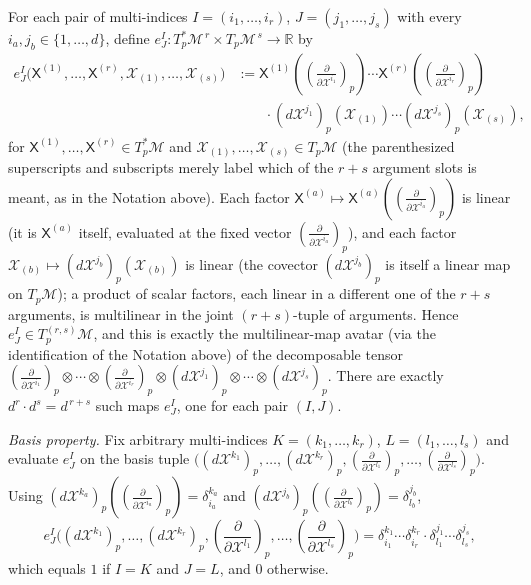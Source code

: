 \documentclass[11pt]{article}
\newcommand{\TpM}{T_p\mathcal M}
\newcommand{\TpsM}{T_p^*\mathcal M}
\newcommand{\TprsM}{T_p^{(r,s)}\mathcal M}
\begin{document}
For each pair of multi-indices $I=(i_1,\dots,i_r)$, $J=(j_1,\dots,j_s)$
with every $i_a,j_b\in\{1,\dots,d\}$, define
$e^I_J:\TpsM^{\,r}\times\TpM^{\,s}\to\mathbb R$ by
\begin{align*}
e^I_J\big(\mathsf X^{(1)},\dots,\mathsf X^{(r)},\mathcal X_{(1)},\dots,\mathcal X_{(s)}\big) &:= \mathsf X^{(1)}\!\left(\left(\frac{\partial}{\partial\mathcal X^{i_1}}\right)_p\right)\cdots \mathsf X^{(r)}\!\left(\left(\frac{\partial}{\partial\mathcal X^{i_r}}\right)_p\right) \\
&\qquad\cdot(d\mathcal X^{j_1})_p(\mathcal X_{(1)})\cdots(d\mathcal X^{j_s})_p(\mathcal X_{(s)}),
\end{align*}
for $\mathsf X^{(1)},\dots,\mathsf X^{(r)}\in\TpsM$ and $\mathcal
X_{(1)},\dots,\mathcal X_{(s)}\in\TpM$ (the parenthesized superscripts and
subscripts merely label which of the $r+s$ argument slots is meant, as in
the Notation above). Each factor $\mathsf X^{(a)}\mapsto\mathsf
X^{(a)}\!\left(\left(\frac{\partial}{\partial\mathcal
X^{i_a}}\right)_p\right)$ is linear (it is $\mathsf X^{(a)}$ itself,
evaluated at the fixed vector $\left(\frac{\partial}{\partial\mathcal
X^{i_a}}\right)_p$), and each factor $\mathcal
X_{(b)}\mapsto(d\mathcal X^{j_b})_p(\mathcal X_{(b)})$ is linear (the
covector $(d\mathcal X^{j_b})_p$ is itself a linear map on $\TpM$); a
product of scalar factors, each linear in a different one of the $r+s$
arguments, is multilinear in the joint $(r+s)$-tuple of arguments. Hence
$e^I_J\in\TprsM$, and this is exactly the multilinear-map avatar (via the
identification of the Notation above) of the decomposable tensor
$\left(\frac{\partial}{\partial\mathcal
X^{i_1}}\right)_p\otimes\cdots\otimes\left(\frac{\partial}{\partial\mathcal
X^{i_r}}\right)_p\otimes(d\mathcal X^{j_1})_p\otimes\cdots\otimes(d\mathcal
X^{j_s})_p$. There are exactly $d^r\cdot d^s=d^{\,r+s}$ such maps $e^I_J$,
one for each pair $(I,J)$.

\emph{Basis property.} Fix arbitrary multi-indices $K=(k_1,\dots,k_r)$,
$L=(l_1,\dots,l_s)$ and evaluate $e^I_J$ on the basis tuple
$\big((d\mathcal X^{k_1})_p,\dots,(d\mathcal
X^{k_r})_p,\left(\frac{\partial}{\partial\mathcal
X^{l_1}}\right)_p,\dots,\left(\frac{\partial}{\partial\mathcal
X^{l_s}}\right)_p\big)$. Using $(d\mathcal
X^{k_a})_p\!\left(\left(\frac{\partial}{\partial\mathcal
X^{i_a}}\right)_p\right)=\delta^{k_a}_{i_a}$ and $(d\mathcal
X^{j_b})_p\!\left(\left(\frac{\partial}{\partial\mathcal
X^{l_b}}\right)_p\right)=\delta^{j_b}_{l_b}$,
\[
e^I_J\big((d\mathcal X^{k_1})_p,\dots,(d\mathcal X^{k_r})_p,\left(\frac{\partial}{\partial\mathcal X^{l_1}}\right)_p,\dots,\left(\frac{\partial}{\partial\mathcal X^{l_s}}\right)_p\big) = \delta^{k_1}_{i_1}\cdots\delta^{k_r}_{i_r}\cdot\delta^{j_1}_{l_1}\cdots\delta^{j_s}_{l_s},
\]
which equals $1$ if $I=K$ and $J=L$, and $0$ otherwise.
\end{document}

